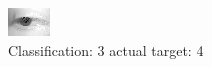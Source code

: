 \begin{figure}[h!]
\begin{center}
\includegraphics[width=0.60\columnwidth]{figures/ID2583_class_3_target_4.png}
\end{center}
\caption{ Classification: 3 actual target: 4}
\label{fig:ID2583_class_3_target_4}
\end{figure}
